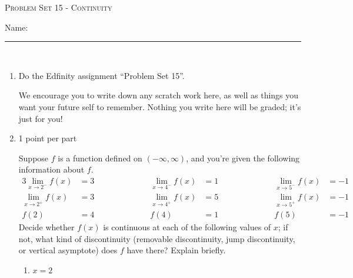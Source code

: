 \documentclass{article}
\newcommand{\doedfinity}[2][\newpage]{
  \begin{problem}[#1]
    Do the Edfinity assignment ``Problem Set #2''.

    We encourage you to write down any scratch work here, as well as
    things you want your future self to remember. Nothing you write
    here will be graded; it's just for you!
  \end{problem}
}
\begin{document}
\begin{center}
  \large\textsc{Problem Set 15 - Continuity}\vspace{.5in}\\
  \begin{problemonly}
   \large Name: \rule{5cm}{0.15mm}\\
   \end{problemonly}
\end{center}

\begin{enumerate}
\item  {}

  \doedfinity{15}

\item  \begin{grading}
    1 point per part
  \end{grading}

  Suppose $f$ is a function defined on $(-\infty, \infty)$, and you're given the following information about $f$.
  \begin{alignat*}{3}
    \lim_{x \to 2^-} f(x) &= 3 \hspace{1in} &
    \lim_{x \to 4^-} f(x) &= 1 \hspace{1in} &
    \lim_{x \to 5^-} f(x) &= -1 \\
    \lim_{x \to 2^+} f(x) &= 3 & \lim_{x \to 4^+} f(x) &= 5 & \lim_{x \to
      5^+} f(x) &= -1  \\
    f(2) &= 4 
    & f(4) &= 1 
    & f(5) &= -1 
  \end{alignat*}
  Decide whether $f(x)$ is continuous at each of the following values of $x$; if not, what kind of discontinuity (removable discontinuity, jump discontinuity, or vertical asymptote) does $f$ have there? Explain briefly.

  \begin{enumerate}
  \item
    \begin{problem}[0.5in]
      $x = 2$
    \end{problem}


\end{enumerate}
\end{enumerate}
\end{document}
